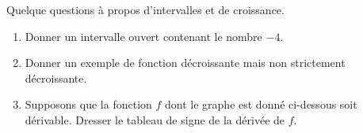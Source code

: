 
\begin{exercice}\label{exoanalyseCTU-0001}

Quelque questions à propos d'intervalles et de croissance.

\begin{enumerate}
    \item
        Donner un intervalle ouvert contenant le nombre \( -4\).
    \item
        Donner un exemple de fonction décroissante mais non strictement décroissante.
    \item
        Supposons que la fonction \( f\) dont le graphe est donné ci-dessous soit dérivable. Dresser le tableau de signe de la dérivée de \( f\).

        \begin{center}
            
        \end{center}
\end{enumerate}


\end{exercice}
